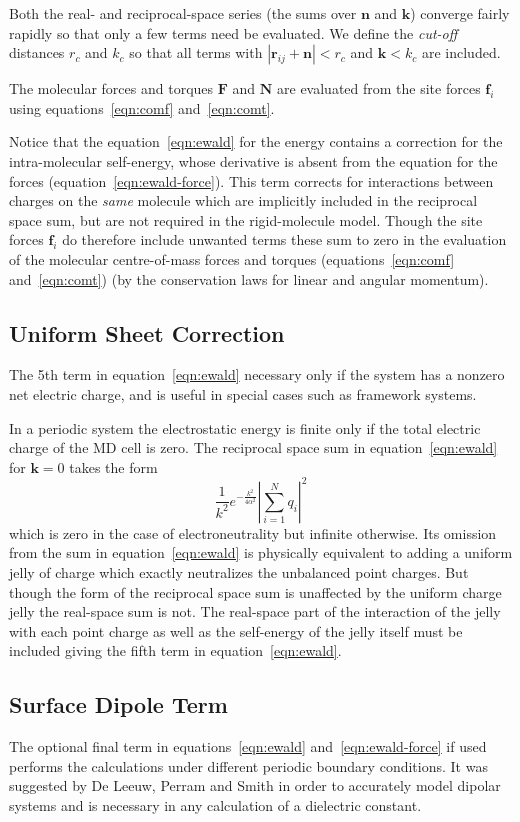 Both the real- and reciprocal-space series (the sums over $\bm{n}$ and
$\bm{k}$) converge fairly rapidly so that only a few terms need be
evaluated.  We define the {\em cut-off\/} distances $r_c$ and $k_c$ so
that all terms with $| \bm{r}_{ij} +\bm{n} | < r_c$ and $\bm{k} < k_c$
are included.

The molecular forces and torques $\bm{F}$ and $\bm{N}$ are evaluated
from the site forces $\bm{f}_i$ using equations~\ref{eqn:comf} 
and~\ref{eqn:comt}.

Notice that the equation~\ref{eqn:ewald} for the energy contains a
correction for the intra-molecular self-energy, whose derivative is
absent from the equation for the forces
(equation~\ref{eqn:ewald-force}).  This term corrects for interactions
between charges on the {\em same\/} molecule which are implicitly
included in the reciprocal space sum, but are not required in the
rigid-molecule model.  Though the site forces $\bm{f}_i$ do therefore
include unwanted terms these sum to zero in the evaluation of the
molecular centre-of-mass forces and torques (equations~\ref{eqn:comf}
and~\ref{eqn:comt}) (by the conservation laws for linear and angular
momentum).

\subsection{Uniform Sheet Correction}
The 5th term in equation~\ref{eqn:ewald} necessary only if the system
has a nonzero net electric charge, and is useful in special cases such
as framework systems.  

In a periodic system the electrostatic energy is finite only if the
total electric charge of the MD cell is zero.  The reciprocal space
sum in equation~\ref{eqn:ewald} for $\bm{k}=0$ takes the form
\[\frac{1}{k^2}e^{-\frac{k^2}{4 \alpha^2}} \left | \sum_{i=1}^{N} q_i
 \right |^2\] which is zero in the case of electroneutrality but
infinite otherwise.  Its omission from the sum in
equation~\ref{eqn:ewald} is physically equivalent to adding a uniform
jelly of charge which exactly neutralizes the unbalanced point
charges.  But though the form of the reciprocal space sum is
unaffected by the uniform charge jelly the real-space sum is not.  The
real-space part of the interaction of the jelly with each point charge
as well as the self-energy of the jelly itself must be included giving
the fifth term in equation~\ref{eqn:ewald}.

\subsection{Surface Dipole Term}
The optional final term in equations~\ref{eqn:ewald} 
and~\ref{eqn:ewald-force} if used performs the calculations under
different periodic boundary conditions.  It was suggested by De Leeuw,
Perram and Smith\cite{deleeuw:80} in order to accurately model
dipolar systems and is necessary in any calculation of a dielectric
constant. 


